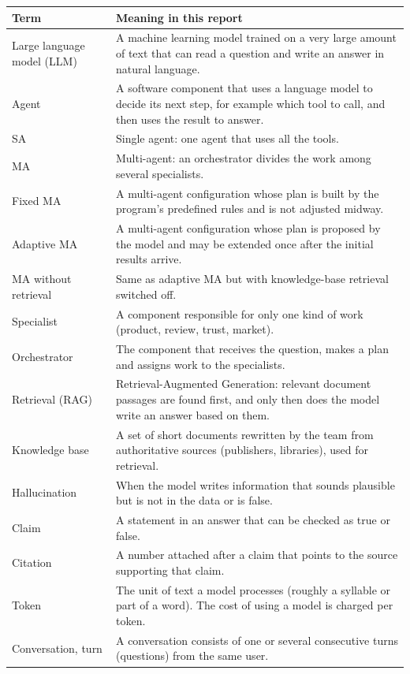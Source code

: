 {\cobang
\begin{longtable}{P{3.4cm}P{11.2cm}}
\toprule
\textbf{Term} & \textbf{Meaning in this report}\\
\midrule
\endhead
Large language model (LLM) & A machine learning model trained on a very large amount of text that can read a question and write an answer in natural language.\\
Agent & A software component that uses a language model to decide its next step, for example which tool to call, and then uses the result to answer.\\
SA & Single agent: one agent that uses all the tools.\\
MA & Multi-agent: an orchestrator divides the work among several specialists.\\
Fixed MA & A multi-agent configuration whose plan is built by the program's predefined rules and is not adjusted midway.\\
Adaptive MA & A multi-agent configuration whose plan is proposed by the model and may be extended once after the initial results arrive.\\
MA without retrieval & Same as adaptive MA but with knowledge-base retrieval switched off.\\
Specialist & A component responsible for only one kind of work (product, review, trust, market).\\
Orchestrator & The component that receives the question, makes a plan and assigns work to the specialists.\\
Retrieval (RAG) & Retrieval-Augmented Generation: relevant document passages are found first, and only then does the model write an answer based on them.\\
Knowledge base & A set of short documents rewritten by the team from authoritative sources (publishers, libraries), used for retrieval.\\
Hallucination & When the model writes information that sounds plausible but is not in the data or is false.\\
Claim & A statement in an answer that can be checked as true or false.\\
Citation & A number attached after a claim that points to the source supporting that claim.\\
Token & The unit of text a model processes (roughly a syllable or part of a word). The cost of using a model is charged per token.\\
Conversation, turn & A conversation consists of one or several consecutive turns (questions) from the same user.\\

\end{longtable}}
